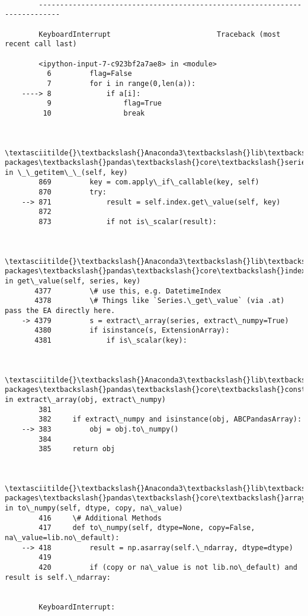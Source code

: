\documentclass[11pt]{article}
\begin{document}
    \begin{Verbatim}[commandchars=\\\{\}]

        ---------------------------------------------------------------------------

        KeyboardInterrupt                         Traceback (most recent call last)

        <ipython-input-7-c923bf2a7ae8> in <module>
          6         flag=False
          7         for i in range(0,len(a)):
    ----> 8             if a[i]:
          9                 flag=True
         10                 break
    

        \textasciitilde{}\textbackslash{}Anaconda3\textbackslash{}lib\textbackslash{}site-packages\textbackslash{}pandas\textbackslash{}core\textbackslash{}series.py in \_\_getitem\_\_(self, key)
        869         key = com.apply\_if\_callable(key, self)
        870         try:
    --> 871             result = self.index.get\_value(self, key)
        872 
        873             if not is\_scalar(result):
    

        \textasciitilde{}\textbackslash{}Anaconda3\textbackslash{}lib\textbackslash{}site-packages\textbackslash{}pandas\textbackslash{}core\textbackslash{}indexes\textbackslash{}base.py in get\_value(self, series, key)
       4377         \# use this, e.g. DatetimeIndex
       4378         \# Things like `Series.\_get\_value` (via .at) pass the EA directly here.
    -> 4379         s = extract\_array(series, extract\_numpy=True)
       4380         if isinstance(s, ExtensionArray):
       4381             if is\_scalar(key):
    

        \textasciitilde{}\textbackslash{}Anaconda3\textbackslash{}lib\textbackslash{}site-packages\textbackslash{}pandas\textbackslash{}core\textbackslash{}construction.py in extract\_array(obj, extract\_numpy)
        381 
        382     if extract\_numpy and isinstance(obj, ABCPandasArray):
    --> 383         obj = obj.to\_numpy()
        384 
        385     return obj
    

        \textasciitilde{}\textbackslash{}Anaconda3\textbackslash{}lib\textbackslash{}site-packages\textbackslash{}pandas\textbackslash{}core\textbackslash{}arrays\textbackslash{}numpy\_.py in to\_numpy(self, dtype, copy, na\_value)
        416     \# Additional Methods
        417     def to\_numpy(self, dtype=None, copy=False, na\_value=lib.no\_default):
    --> 418         result = np.asarray(self.\_ndarray, dtype=dtype)
        419 
        420         if (copy or na\_value is not lib.no\_default) and result is self.\_ndarray:
    

        KeyboardInterrupt: 

    \end{Verbatim}
\end{document}
